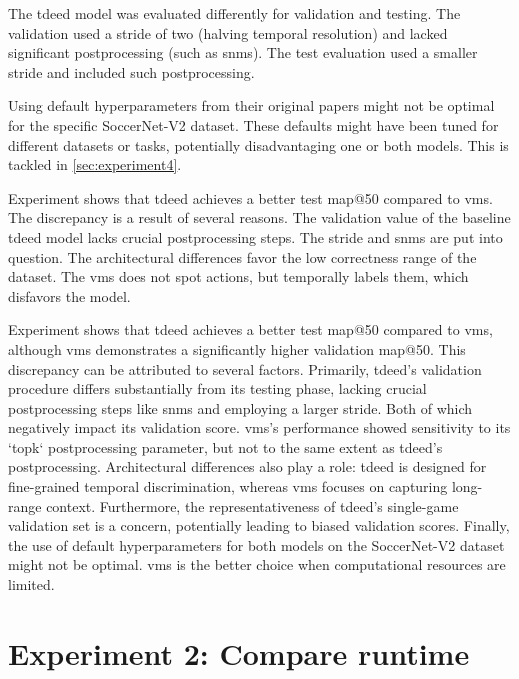 The \acrshort{tdeed} model was evaluated differently for validation and testing. The validation used a stride of two (halving temporal resolution) and lacked significant postprocessing (such as \acrshort{snms}). The test evaluation used a smaller stride and included such postprocessing. 


Using default hyperparameters from their original papers might not be optimal for the specific SoccerNet-V2 dataset. These defaults might have been tuned for different datasets or tasks, potentially disadvantaging one or both models. This is tackled in \autoref{sec:experiment4}.


Experiment shows that \acrshort{tdeed} achieves a better test \acrshort{map}@50 compared to \acrshort{vms}. The discrepancy is a result of several reasons. The validation value of the baseline \acrshort{tdeed} model lacks crucial postprocessing steps. The stride and \acrfull{snms} are put into question. The architectural differences favor the low correctness range of the dataset. The \acrshort{vms} does not spot actions, but temporally labels them, which disfavors the model. 

Experiment shows that \acrshort{tdeed} achieves a better test \acrshort{map}@50 compared to \acrshort{vms}, although \acrshort{vms} demonstrates a significantly higher validation \acrshort{map}@50. This discrepancy can be attributed to several factors. Primarily, \acrshort{tdeed}'s validation procedure differs substantially from its testing phase, lacking crucial postprocessing steps like \acrfull{snms} and employing a larger stride. Both of which negatively impact its validation score. \acrshort{vms}'s performance showed sensitivity to its `topk` postprocessing parameter, but not to the same extent as \acrshort{tdeed}'s postprocessing. Architectural differences also play a role: \acrshort{tdeed} is designed for fine-grained temporal discrimination, whereas \acrshort{vms} focuses on capturing long-range context. Furthermore, the representativeness of \acrshort{tdeed}'s single-game validation set is a concern, potentially leading to biased validation scores. Finally, the use of default hyperparameters for both models on the SoccerNet-V2 dataset might not be optimal. \acrshort{vms} is the better choice when computational resources are limited.

\section{Experiment 2: Compare runtime}
\label{sec:experiment2}

